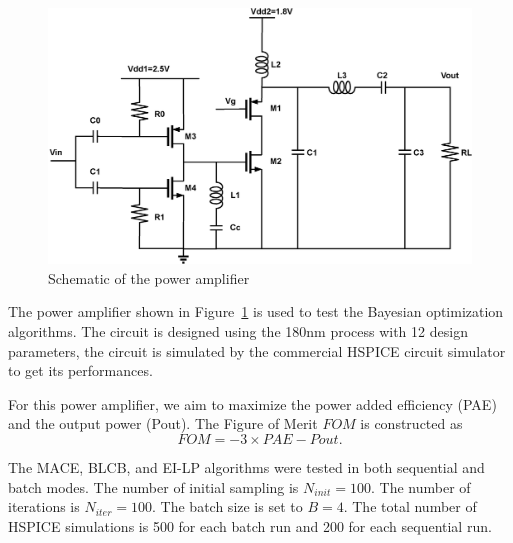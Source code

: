 \begin{figure}[]
    \begin{center}
        \centerline{\includegraphics[width=\columnwidth]{./img/classE.eps}}
        \caption{Schematic of the power amplifier}
        \label{fig:schPA}
    \end{center}
\end{figure}

The power amplifier shown in Figure~\ref{fig:schPA} is used to test the Bayesian optimization algorithms. The
circuit is designed using the 180nm process with 12 design parameters, the
circuit is simulated by the commercial HSPICE circuit simulator to get its performances.

For this power amplifier, we aim to maximize the power added efficiency (PAE) and the output power (Pout). The Figure of Merit $FOM$ is constructed as
$$
\mathit{FOM} = -3 \times \mathit{PAE} - \mathit{Pout}.
$$

The MACE, BLCB, and EI-LP algorithms were tested in both sequential and batch
modes. The number of initial sampling is $N_{init} = 100$. The number of
iterations is $N_{iter} = 100$. The batch size is set to $B = 4$. The total
number of HSPICE simulations is 500 for each batch run and 200 for each
sequential run.


